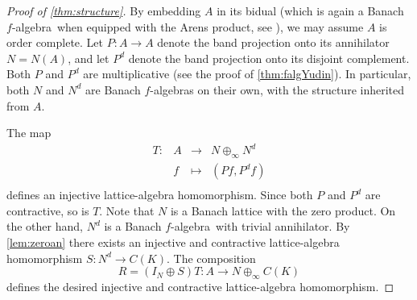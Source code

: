 \documentclass{memo-l}
\theoremstyle{definition}
\theoremstyle{remark}
\numberwithin{section}{chapter}
\numberwithin{equation}{chapter}
\newcommand{\falg}{$f\!$-algebra}
\begin{document}
\begin{proof}[Proof of \cref{thm:structure}]
    By embedding $A$ in its bidual (which is again a Banach
    \falg\ when equipped with the Arens product, see \cite{scheffold1991}), we may assume $A$ is order complete.
    Let $P\colon A\to A$ denote the band projection onto
    its annihilator $N=N(A)$,
    and let $P^{d}$ denote the band projection onto its disjoint
    complement. Both $P$ and $P^{d}$ are
    multiplicative (see the proof of \cref{thm:falgYudin}). In particular, both $N$ and $N^{d}$
    are Banach \falg s on their own, with the structure inherited from
    $A$.

    The map
    \[
    \begin{array}{cccc}
    T\colon& A & \longrightarrow & N\oplus_\infty N^{d} \\
            & f & \longmapsto & (Pf,P^{d}f) \\
    \end{array}
    \]
    defines an injective lattice-algebra homomorphism.
    Since both $P$ and $P^{d}$ are contractive, so is $T$.
    Note that $N$ is a Banach lattice with the zero product.
    On the other hand, $N^{d}$ is a Banach \falg\ with trivial
    annihilator. By \cref{lem:zeroan} there exists an injective and contractive lattice-algebra
    homomorphism $S\colon N^{d}\to C(K)$. The composition
    \[
        R=(I_N\oplus S)T\colon A\to N\oplus_\infty C(K)
    \]
    defines the desired injective and contractive lattice-algebra homomorphism.
\end{proof}
\end{document}
